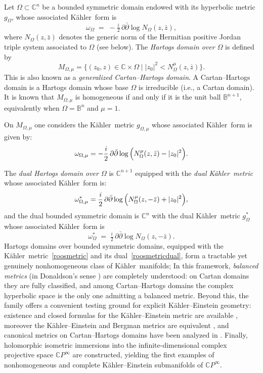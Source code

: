 \documentclass[reqno, 11pt]{amsart}
\newcommand{\B}{\mathbb{B}}
\newcommand{\C}{\mathbb{C}}
\newcommand{\K}{K\"ahler}
\begin{document}
Let $\Omega\subset\mathbb{C}^n$ be a bounded symmetric domain endowed with its hyperbolic metric $g_{\Omega}$, whose associated \K\  form is
$$
\omega_{\Omega}
\;=\;
-\tfrac{i}{2}\,\partial\bar\partial \log N_{\Omega}(z,\bar z),
$$
where $N_{\Omega}(z,\bar z)$ denotes the generic norm of the Hermitian positive Jordan triple system associated to $\Omega$ (see below).
The \emph{Hartogs domain over $\Omega$} is defined by
\[
M_{\Omega,\mu}
=\bigl\{(z_{0},z)\in\mathbb{C}\times\Omega
\;\big|\;
|z_{0}|^{2}<N_{\Omega}^\mu(z,\bar z)\bigr\}.
\]
This is also known as a {\em generalized Cartan--Hartogs domain}. 
A Cartan--Hartogs domain is a Hartogs domain whose base $\Omega$ is irreducible (i.e., a Cartan domain). 
It is known that $M_{\Omega,\mu}$ is homogeneous if and only if it is the unit ball $\B^{n+1}$, 
equivalently when $\Omega=\B^n$ and $\mu=1$.

On $M_{\Omega,\mu}$ one considers the \K\   metric $g_{\Omega, \mu}$ whose associated \K\ form is given by:
\begin{equation}\label{roosmetric}
\omega_{\Omega, \mu}
=-\frac{i}{2}\,\partial\bar\partial
\log\ \!\Bigl(N_{\Omega}^\mu(z,\bar z)-|z_{0}|^{2}\Bigr).
\end{equation}

The \emph{dual Hartogs domain over $\Omega$} is $\mathbb{C}^{n+1}$ equipped with the \emph{dual \K\ metric} whose associated \K\  form is:
\begin{equation}\label{roosmetricdual}
\omega^{*}_{\Omega, \mu}
=\frac{i}{2}\,\partial\bar\partial
\log\ \!\Bigl(N_{\Omega}^\mu(z,-\bar z)+|z_{0}|^{2}\Bigr),
\end{equation}
and the dual bounded symmetric domain is $\C^n$
with the dual \K\ metric $g_{\Omega}^*$ whose associated
\K\ form is
$$
\omega^*_{\Omega}
\;=\;
\tfrac{i}{2}\,\partial\bar\partial \log N_{\Omega}(z,-\bar z).
$$
Hartogs domains over bounded symmetric domains, equipped with the \K\ metric~\eqref{roosmetric} and its dual~\eqref{roosmetricdual}, form a tractable yet genuinely nonhomogeneous class of \K\ manifolds; 
In this framework, \emph{balanced metrics} (in Donaldson's sense \cite{Donaldson2001}) are completely understood: on Cartan domains they are fully classified, and among Cartan--Hartogs domains the complex hyperbolic space is the only one admitting a balanced metric. 
Beyond this, the family offers a convenient testing ground for explicit K\"ahler--Einstein geometry: existence and closed formulas for the K\"ahler--Einstein metric are available \cite{WangWangZhang2009,DengXiaoYang2011}, moreover  the K\"ahler--Einstein and Bergman metrics are equivalent \cite{YinZhang2008,ZhaoLin2008}, and canonical metrics on Cartan--Hartogs domains have been analyzed in \cite{Zedda2012}. 
Finally, holomorphic isometric immersions into the infinite-dimensional complex projective space $\mathbb{C}P^\infty$ are constructed, yielding the first examples  of  nonhomogeneous and complete K\"ahler--Einstein
submanifolds of $\mathbb{C}P^\infty$\cite{LoiZedda2011,HaoWangZhang2015,LoiZeddaBook2018}.
\end{document}
